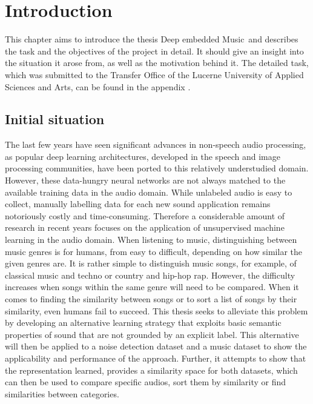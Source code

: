 \chapter{Introduction}
\label{ch:Introduction}
This chapter aims to introduce the thesis \flqq Deep embedded Music\frqq \ and describes the task and the objectives of the project in detail. It should give an insight into the situation it arose from, as well as the motivation behind it. The detailed task, which was submitted to the Transfer Office of the Lucerne University of Applied Sciences and Arts, can be found in the appendix .

\section{Initial situation}
\label{sub:Initial-Stituation}
The last few years have seen significant advances in non-speech audio processing, as popular deep learning architectures, developed in the speech and image processing communities, have been ported to this relatively understudied domain. However, these data-hungry neural networks are not always matched to the available training data in the audio domain. While unlabeled audio is easy to collect, manually labelling data for each new sound application remains notoriously costly and time-consuming. Therefore a considerable amount of research in recent years focuses on the application of unsupervised machine learning in the audio domain.
\newline
\newline
When listening to music, distinguishing between music genres is for humans, from easy to difficult, depending on how similar the given genres are. It is rather simple to distinguish music songs, for example, of classical music and techno or country and hip-hop rap. However, the difficulty increases when songs within the same genre will need to be compared. When it comes to finding the similarity between songs or to sort a list of songs by their similarity, even humans fail to succeed. 
\newline
\newline
This thesis seeks to alleviate this problem by developing an alternative learning strategy that exploits basic semantic properties of sound that are not grounded by an explicit label. This alternative will then be applied to a noise detection dataset and a music dataset to show the applicability and performance of the approach. Further, it attempts to show that the representation learned, provides a similarity space for both datasets, which can then be used to compare specific audios, sort them by similarity or find similarities between categories.

